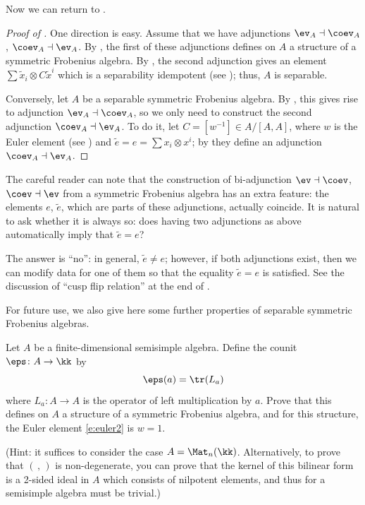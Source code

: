 Now we can return to .

\begin{proof}[Proof of ]
  One direction is easy. Assume that we have adjunctions $\ev_A\dashv\coev_A$,
  $\coev_A\dashv\ev_A$. By , the first of these
  adjunctions defines on $A$ a structure of a symmetric Frobenius algebra. By
  , the second adjunction gives an element $\sum
  \tilde x_i \otimes C\tilde x^i$ which is a separability idempotent (see
  ); thus, $A$ is separable.

  Conversely, let $A$ be a separable symmetric Frobenius algebra. By
  , this gives rise to adjunction $\ev_A\dashv\coev_A$,
  so we only need to construct the second adjunction $\coev_A\dashv\ev_A$. To do
  it, let $C=[w^{-1}]\in A/[A,A]$, where $w$ is the Euler element (see
  ) and $\tilde e=e =\sum x_i \otimes x^i$; by
   they define an adjunction $\coev_A\dashv
  \ev_A$.
\end{proof}
\begin{remark}
  The careful reader can note that the construction of bi-adjunction
  $\ev\dashv\coev$, $\coev\dashv\ev$ from a symmetric Frobenius algebra has an
  extra feature: the elements $e$, $\tilde e$, which are parts of these
  adjunctions, actually coincide. It is natural to ask whether it is always so:
  does having two adjunctions as above automatically imply that $\tilde e=e$?

  The answer is ``no'': in general, $\tilde e\ne e$; however, if both
  adjunctions exist, then we can modify data for one of them so that the equality
  $\tilde e=e$ is satisfied. See the discussion of ``cusp flip relation'' at the end
  of .
\end{remark}


For future use, we also give here some further properties of separable symmetric
Frobenius algebras.

\begin{exercise}\label{ec:standard-frobenius}
  Let $A$ be a finite-dimensional semisimple algebra. Define the counit
  $\eps\colon A\to \kk$ by
  $$
  \eps(a) = \tr(L_a)
  $$
  where $L_a\colon A\to A$ is the operator of left multiplication by $a$.
  Prove that this defines on $A$ a structure of a symmetric Frobenius algebra,
  and for this structure, the Euler element \eqref{e:euler2} is $w=1$.

  (Hint: it suffices to consider the case $A=\Mat_n(\kk)$. Alternatively, to
prove that $(\, ,\, )$ is non-degenerate, you can prove that the kernel
of this bilinear form is a 2-sided ideal in $A$ which consists of
nilpotent elements, and thus for a semisimple algebra must be trivial.)
\end{exercise}



